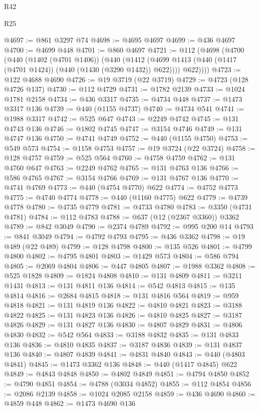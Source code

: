 \begin{lexlean}{R42}
\begin{lexlean}{R25}
\begin{coremodule}
{{{{{{{{{{{{{{{{{{{{{{{{{{{{{{{{{{{{{{{{{{{{{{{{{{{{{{{{{{{{{{{{{{{{{{{{{{{{{{{{{{{{{{{{{{{{{{{{{{{{{{{{{{{{{{{{{{{{{{{{{{{{{{{{{{{{{{{{{{{{{{{{{{{{{{{{{{{{{{{{{{{{{{{{{{{{{{{{{{{{{{{{{{{{{{{{{{{{{{{@4697 := @861 @3297 @74
@4698 := @4695 @4697
@4699 := @436 @4697
@4700 := @4699 @448
@4701 := @860 @4697
@4721 := @112
    (@4698
      (@4700
        (@440
          (@1402 (@4701 @1406))
          (@440
            (@1412 (@4699 @1413 (@440 (@1417 (@4701 @1424)) (@440 (@1430 (@3290 @1432)) @622))))
            @622))))
@4723 := @122 @4688 @4690
@4726 := @19 @3719 (@22 @3719)
@4729 := @4723 (@128 @4726 @137)
@4730 := @112 @4729
@4731 := @1782 @2139
@4733 := @1024 @1781 @2158
@4734 := @436 @3317
@4735 := @4734 @448
@4737 := @1473 @3317 @136
@4739 := @440 (@1155 @4737)
@4740 := @4734 @541
@4741 := @1988 @3317
@4742 := @525 @647
@4743 := @2249 @4742
@4745 := @131 @4743 @136
@4746 := @1802 @4745
@4747 := @3154 @4746
@4749 := @131 @4747 @136
@4750 := @4741 @4749
@4752 := @440 (@1155 @4750)
@4753 := @549 @573
@4754 := @1158 @4753
@4757 := @19 @3724 (@22 @3724)
@4758 := @128 @4757
@4759 := @525 @564
@4760 := @4758 @4759
@4762 := @131 @4760 @647
@4763 := @2249 @4762
@4765 := @131 @4763 @136
@4766 := @586 @4765
@4767 := @3154 @4766
@4769 := @131 @4767 @136
@4770 := @4741 @4769
@4773 := @440 (@4754 @4770) @622
@4774 := @4752 @4773
@4775 := @4740 @4774
@4778 := @440 (@1160 @4775) @622
@4779 := @4739 @4778
@4780 := @4735 @4779
@4781 := @4733 @4780
@4783 := @3350 (@4731 @4781)
@4784 := @112 @4783
@4788 := @637 (@12 (@2367 @3360)) @3362
@4789 := @842 @3049
@4790 := @2374 @4789
@4792 := @995 @200 @14
@4793 := @841 @3049
@4794 := @4792 @4793
@4795 := @436 @3362
@4798 := @19 @489 (@22 @489)
@4799 := @128 @4798
@4800 := @135 @526
@4801 := @4799 @4800
@4802 := @4795 @4801
@4803 := @1429 @573
@4804 := @586 @794
@4805 := @2069 @4804
@4806 := @447 @4805
@4807 := @1988 @3362
@4808 := @525 @1828
@4809 := @1824 @4808
@4810 := @131 @4809
@4811 := @3211 @1431
@4813 := @131 @4811 @136
@4814 := @542 @4813
@4815 := @135 @4814
@4816 := @2684 @4815
@4818 := @131 @4816 @564
@4819 := @959 @4818
@4821 := @131 @4819 @136
@4822 := @4810 @4821
@4823 := @3188 @4822
@4825 := @131 @4823 @136
@4826 := @4810 @4825
@4827 := @3187 @4826
@4829 := @131 @4827 @136
@4830 := @4807 @4829
@4831 := @4806 @4830
@4832 := @542 @564
@4833 := @3188 @4832
@4835 := @131 @4833 @136
@4836 := @4810 @4835
@4837 := @3187 @4836
@4839 := @131 @4837 @136
@4840 := @4807 @4839
@4841 := @4831 @4840
@4843 := @440 (@4803 @4841)
@4845 := @1473 @3362 @136
@4848 := @440 (@1417 @4845) @622
@4849 := @4843 @4848
@4850 := @4802 @4849
@4851 := @4794 @4850
@4852 := @4790 @4851
@4854 := @4788 (@3034 @4852)
@4855 := @112 @4854
@4856 := @2086 @2139
@4858 := @1024 @2085 @2158
@4859 := @436 @4690
@4860 := @4859 @448
@4862 := @1473 @4690 @136
}}}}}}}}}}}}}}}}}}}}}}}}}}}}}}}}}}}}}}}}}}}}}}}}}}}}}}}}}}}}}}}}}}}}}}}}}}}}}}}}}}}}}}}}}}}}}}}}}}}}}}}}}}}}}}}}}}}}}}}}}}}}}}}}}}}}}}}}}}}}}}}}}}}}}}}}}}}}}}}}}}}}}}}}}}}}}}}}}}}}}}}}}}}}}}}}}}}}}}}
\end{coremodule}
\end{lexlean}
\end{lexlean}
